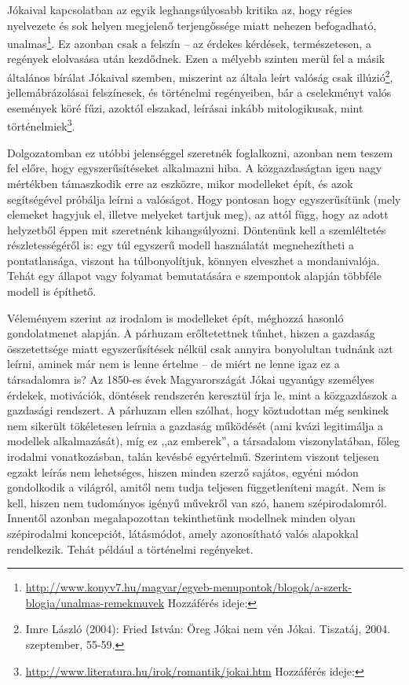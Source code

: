 \documentclass{thesis-ekf}
\begin{document}
    Jókaival kapcsolatban az egyik leghangsúlyosabb kritika az, hogy régies nyelvezete és sok helyen megjelenő
        terjengőssége miatt nehezen befogadható, unalmas\footnote{
            \url{http://www.konyv7.hu/magyar/egyeb-menupontok/blogok/a-szerk-blogja/unalmas-remekmuvek}
            Hozzáférés ideje: }.
    Ez azonban csak a felszín – az érdekes kérdések, természetesen, a regények elolvasása után kezdődnek.
    Ezen a mélyebb szinten merül fel a másik általános bírálat Jókaival szemben, miszerint az általa leírt valóság csak
        illúzió\footnote{Imre László (2004): Fried István: Öreg Jókai nem vén Jókai. Tiszatáj, 2004. szeptember, 55-59.},
        jellemábrázolásai felszínesek, és történelmi regényeiben, bár a cselekményt valós események köré fűzi,
        azoktól elszakad, leírásai inkább mitologikusak, mint történelmiek\footnote{
            \url{http://www.literatura.hu/irok/romantik/jokai.htm}
            Hozzáférés ideje: }.

    Dolgozatomban ez utóbbi jelenséggel szeretnék foglalkozni, azonban nem teszem fel előre, hogy egyszerűsítéseket
        alkalmazni hiba.
    A közgazdaságtan igen nagy mértékben támaszkodik erre az eszközre, mikor modelleket épít, és azok segítségével
        próbálja leírni a valóságot.
    Hogy pontosan hogy egyszerűsítünk (mely elemeket hagyjuk el, illetve melyeket tartjuk meg), az attól függ,
        hogy az adott helyzetből éppen mit szeretnénk kihangsúlyozni.
    Döntenünk kell a szemléltetés részletességéről is: egy túl egyszerű modell használatát megnehezítheti a
        pontatlansága, viszont ha túlbonyolítjuk, könnyen elveszhet a mondanivalója.
    Tehát egy állapot vagy folyamat bemutatására e szempontok alapján többféle modell is építhető.

    Véleményem szerint az irodalom is modelleket épít, méghozzá hasonló gondolatmenet alapján.
    A párhuzam erőltetettnek tűnhet, hiszen a gazdaság összetettsége miatt egyszerűsítések nélkül csak annyira
        bonyolultan tudnánk azt leírni, aminek már nem is lenne értelme – de miért ne lenne igaz ez a társadalomra is?
    Az 1850-es évek Magyarországát Jókai ugyanúgy személyes érdekek, motivációk, döntések rendszerén keresztül írja le,
        mint a közgazdászok a gazdasági rendszert.
    A párhuzam ellen szólhat, hogy köztudottan még senkinek nem sikerült tökéletesen leírnia a gazdaság működését
        (ami kvázi legitimálja a modellek alkalmazását), míg ez ,,az emberek'', a társadalom viszonylatában,
        főleg irodalmi vonatkozásban, talán kevésbé egyértelmű.
    Szerintem viszont teljesen egzakt leírás nem lehetséges, hiszen minden szerző sajátos, egyéni módon gondolkodik
        a világról, amitől nem tudja teljesen függetleníteni magát.
    Nem is kell, hiszen nem tudományos igényű művekről van szó, hanem szépirodalomról.
    Innentől azonban megalapozottan tekinthetünk modellnek minden olyan szépirodalmi koncepciót, látásmódot,
        amely azonosítható valós alapokkal rendelkezik.
    Tehát például a történelmi regényeket.
\end{document}
